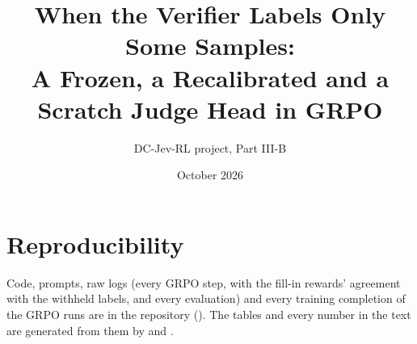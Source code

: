 \documentclass[11pt]{article}
\title{When the Verifier Labels Only Some Samples:\\A Frozen, a Recalibrated and a Scratch Judge Head in GRPO}
\author{DC-Jev-RL project, Part III-B}
\date{October 2026}
\begin{document}
\maketitle

\begin{abstract}

\end{abstract}






\section*{Reproducibility}
Code, prompts, raw logs (every GRPO step, with the fill-in rewards' agreement with the withheld labels, and every
evaluation) and every training completion of the GRPO runs are in the repository (). The tables and every number in the text are
generated from them by  and .



\end{document}
